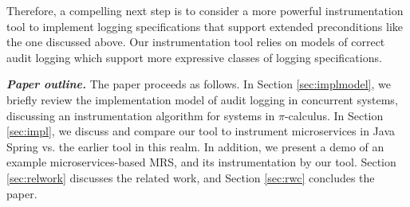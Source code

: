 Therefore, a compelling next step is to consider a more powerful instrumentation tool to implement logging specifications that support extended preconditions like the one discussed above. Our instrumentation tool relies on models of correct audit logging which support more expressive classes of logging specifications.




\textbf{\textit{Paper outline.}}
The paper proceeds as follows. In Section \ref{sec:implmodel}, we briefly review the implementation model of audit logging in concurrent systems, discussing an instrumentation algorithm for systems in $\pi$-calculus. In Section \ref{sec:impl}, we discuss and compare our tool to instrument microservices in Java Spring vs. the earlier tool in this realm. In addition, we present a demo of an example microservices-based MRS, and its instrumentation by our tool. Section \ref{sec:relwork} discusses the related work, and Section \ref{sec:rwc} concludes the paper.
